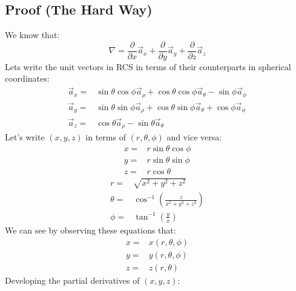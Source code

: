             \subsection{Proof (The Hard Way)}
                We know that:
                $$\nabla = \frac{\partial}{\partial x}\vec{a}_x + \frac{\partial}{\partial y}\vec{a}_y + \frac{\partial}{\partial z}\vec{a}_z$$
                Lets write the unit vectors in RCS in terms of their counterparts in spherical coordinates:
                \begin{align*}
                    \vec{a}_x = & \sin\theta\cos\phi\vec{a}_\rho + \cos\theta\cos\phi\vec{a}_\theta - \sin\phi\vec{a}_\phi \\ 
                    \vec{a}_y = & \sin\theta\sin\phi\vec{a}_\rho + \cos\theta\sin\phi\vec{a}_\theta + \cos\phi\vec{a}_\phi \\
                    \vec{a}_z = & \cos\theta\vec{a}_\rho - \sin\theta\vec{a}_\theta
                \end{align*}
                Let's write $(x, y, z)$ in terms of $(r, \theta, \phi)$ and vice versa:
                \begin{align*}
                    x = & r\sin\theta\cos\phi \\
                    y = & r\sin\theta\sin\phi \\
                    z = & r\cos\theta
                \end{align*}
                \begin{align*}
                    r = & \sqrt{x^2 + y^2 + z^2} \\
                    \theta = & \cos^{-1}\left(\frac{z}{x^2 + y^2 + z^2}\right) \\
                    \phi = & \tan^{-1}\left(\frac{y}{x}\right)
                \end{align*}
                We can see by observing these equations that:
                \begin{align*}
                    x = & x(r, \theta, \phi) \\
                    y = & y(r, \theta, \phi) \\
                    z = & z(r, \theta)
                \end{align*}
                Developing the partial derivatives of $(x, y, z)$:
